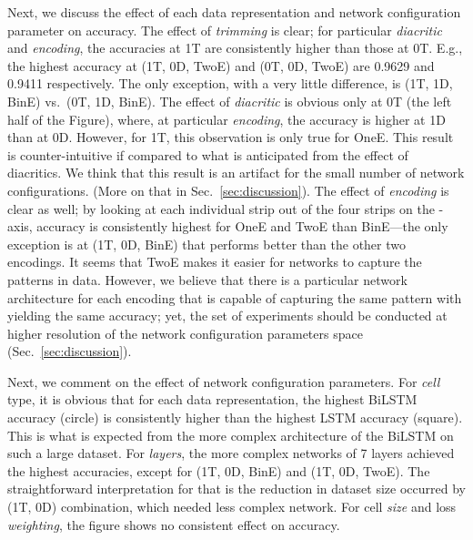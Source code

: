 \documentclass[journal,10pt,twocolumns,letter]{IEEEtran}
\begin{document}
Next, we discuss the effect of each data representation and network configuration parameter on
accuracy. The effect of \textit{trimming} is clear; for particular \textit{diacritic} and
\textit{encoding}, the accuracies at 1T are consistently higher than those at 0T. E.g., the highest
accuracy at (1T, 0D, TwoE) and (0T, 0D, TwoE) are 0.9629 and 0.9411 respectively. The only
exception, with a very little difference, is (1T, 1D, BinE) vs.\ (0T, 1D, BinE). The effect of
\textit{diacritic} is obvious only at 0T (the left half of the Figure), where, at particular
\textit{encoding}, the accuracy is higher at 1D than at 0D. However, for 1T, this observation is
only true for OneE. This result is counter-intuitive if compared to what is anticipated from the
effect of diacritics. We think that this result is an artifact for the small number of network
configurations. (More on that in Sec.~\ref{sec:discussion}). The effect of \textit{encoding} is
clear as well; by looking at each individual strip out of the four strips on the -axis, accuracy
is consistently highest for OneE and TwoE than BinE---the only exception is at (1T, 0D, BinE) that
performs better than the other two encodings. It seems that TwoE makes it easier for networks to
capture the patterns in data. However, we believe that there is a particular network architecture
for each encoding that is capable of capturing the same pattern with yielding the same accuracy; yet,
the set of experiments should be conducted at higher resolution of the network configuration
parameters space (Sec.~\ref{sec:discussion}).

Next, we comment on the effect of network configuration parameters. For \textit{cell} type, it is
obvious that for each data representation, the highest BiLSTM accuracy (circle) is consistently higher
than the highest LSTM accuracy (square). This is what is expected from the more complex architecture of
the BiLSTM on such a large dataset. For \textit{layers}, the more complex networks of 7 layers
achieved the highest accuracies, except for (1T, 0D, BinE) and (1T, 0D, TwoE). The straightforward
interpretation for that is the reduction in dataset size occurred by (1T, 0D) combination, which
needed less complex network. For cell \textit{size} and loss \textit{weighting}, the figure shows no
consistent effect on accuracy.

\bigskip
\end{document}
